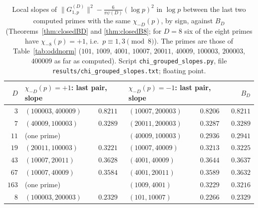 \documentclass[11pt]{amsart}
\theoremstyle{remark}
\begin{document}
\begin{table}[htbp]
\centering\footnotesize\setlength{\tabcolsep}{5pt}
\begin{tabular}{r|ll|ll|r}
\toprule
$D$ & \multicolumn{2}{l|}{$\chi_{-D}(p)=+1$: last pair, slope} & \multicolumn{2}{l|}{$\chi_{-D}(p)=-1$: last pair, slope} & $B_D$\\
\midrule
$3$ & $(100003,400009)$ & $0.8211$ & $(10007,200003)$ & $0.8206$ & $0.8211$\\
$7$ & $(40009,100003)$ & $0.3289$ & $(20011,200003)$ & $0.3287$ & $0.3289$\\
$11$ & (one prime) & & $(40009,100003)$ & $0.2936$ & $0.2941$\\
$19$ & $(20011,100003)$ & $0.3221$ & $(10007,40009)$ & $0.3213$ & $0.3225$\\
$43$ & $(10007,20011)$ & $0.3628$ & $(4001,40009)$ & $0.3644$ & $0.3637$\\
$67$ & $(10007,40009)$ & $0.3584$ & $(4001,20011)$ & $0.3589$ & $0.3632$\\
$163$ & (one prime) & & $(1009,4001)$ & $0.3229$ & $0.3216$\\
$8$ & $(100003,200003)$ & $0.2329$ & $(101,10007)$ & $0.2266$ & $0.2329$\\
\bottomrule
\end{tabular}
\medskip
\caption{Local slopes of $\|G^{(D)}_{1,p}\|^2-\frac6{\pi\psi(D)}(\log p)^2$ in $\log p$ between the last two computed primes with the same $\chi_{-D}(p)$, by sign, against $B_D$ (Theorems~\ref{thm:closedBD} and \ref{thm:closedB8}; for $D=8$ six of the eight primes have $\chi_{-8}(p)=+1$, i.e.\ $p\equiv1,3\pmod8$). The primes are those of Table~\ref{tab:oddnorm} ($101$, $1009$, $4001$, $10007$, $20011$, $40009$, $100003$, $200003$, $400009$ as far as computed). Script \texttt{chi\_grouped\_slopes.py}, file \texttt{results/chi\_grouped\_slopes.txt}; floating point.}
\label{tab:chislopes}
\end{table}
\end{document}
